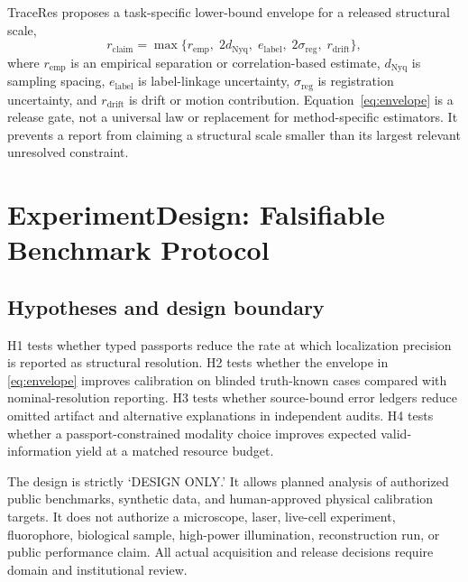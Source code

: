 \documentclass[conference]{IEEEtran}
\begin{document}
TraceRes proposes a task-specific lower-bound envelope for a released structural scale,
\begin{equation}
 r_{\mathrm{claim}}=\max\{r_{\mathrm{emp}},\;2d_{\mathrm{Nyq}},\;e_{\mathrm{label}},\;2\sigma_{\mathrm{reg}},\;r_{\mathrm{drift}}\},
\label{eq:envelope}
\end{equation}
where \(r_{\mathrm{emp}}\) is an empirical separation or correlation-based estimate, \(d_{\mathrm{Nyq}}\) is sampling spacing, \(e_{\mathrm{label}}\) is label-linkage uncertainty, \(\sigma_{\mathrm{reg}}\) is registration uncertainty, and \(r_{\mathrm{drift}}\) is drift or motion contribution. Equation~\eqref{eq:envelope} is a release gate, not a universal law or replacement for method-specific estimators. It prevents a report from claiming a structural scale smaller than its largest relevant unresolved constraint.

\section{ExperimentDesign: Falsifiable Benchmark Protocol}

\subsection{Hypotheses and design boundary}

H1 tests whether typed passports reduce the rate at which localization precision is reported as structural resolution. H2 tests whether the envelope in \eqref{eq:envelope} improves calibration on blinded truth-known cases compared with nominal-resolution reporting. H3 tests whether source-bound error ledgers reduce omitted artifact and alternative explanations in independent audits. H4 tests whether a passport-constrained modality choice improves expected valid-information yield at a matched resource budget.

The design is strictly `DESIGN ONLY.' It allows planned analysis of authorized public benchmarks, synthetic data, and human-approved physical calibration targets. It does not authorize a microscope, laser, live-cell experiment, fluorophore, biological sample, high-power illumination, reconstruction run, or public performance claim. All actual acquisition and release decisions require domain and institutional review.
\end{document}
